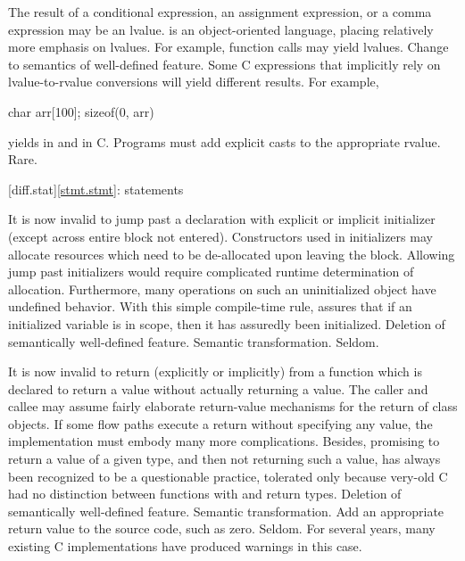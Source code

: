 %
%
%
\change
The result of a conditional expression, an assignment expression, or a comma expression may be an lvalue.
\rationale
\Cpp{} is an object-oriented language, placing relatively
more emphasis on lvalues.  For example, function calls may
yield lvalues.
\effect
Change to semantics of well-defined feature.  Some C
expressions that implicitly rely on lvalue-to-rvalue
conversions will yield different results.
For example,
\begin{codeblock}
char arr[100];
sizeof(0, arr)
\end{codeblock}
yields
in \Cpp{} and
in C.
\difficulty
Programs must add explicit casts to the appropriate rvalue.
\howwide
Rare.

[diff.stat]{\ref{stmt.stmt}: statements}

\change
It is now invalid to jump past a declaration with explicit or implicit initializer (except across entire block not entered).
\rationale
Constructors used in initializers may allocate
resources which need to be de-allocated upon leaving the
block.
Allowing jump past initializers would require
complicated runtime determination of allocation.
Furthermore, many operations on such an uninitialized object
have undefined behavior.
With this simple compile-time rule, \Cpp{} assures that
if an initialized variable is in scope, then it has assuredly been
initialized.
\effect
Deletion of semantically well-defined feature.
\difficulty
Semantic transformation.
\howwide
Seldom.

\change
It is now invalid to return (explicitly or implicitly) from a function which is
declared to return a value without actually returning a value.
\rationale
The caller and callee may assume fairly elaborate
return-value mechanisms for the return of class objects.
If
some flow paths execute a return without specifying any value,
the implementation must embody many more complications.
Besides,
promising to return a value of a given type, and then not returning
such a value, has always been recognized to be a questionable
practice, tolerated only because very-old C had no distinction between
functions with  and  return types.
\effect
Deletion of semantically well-defined feature.
\difficulty
Semantic transformation.
Add an appropriate return value to the source code, such as zero.
\howwide
Seldom.
For several years, many existing C implementations have produced warnings in
this case.


